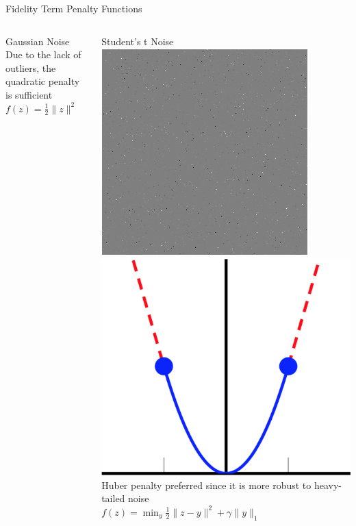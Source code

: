 \documentclass[12pt]{beamer}
\begin{document}
\begin{frame}{Fidelity Term Penalty Functions}
\begin{columns}[T]
\begin{column}{0.45\linewidth}
\begin{block}{Gaussian Noise}
		{\footnotesize Due to the lack of outliers, the quadratic penalty is sufficient} \\[1ex]
		\hspace{3em} $f(z) = \frac{1}{2} \| z \|^2$
		\end{block}
	\end{column}
	\begin{column}{0.45\linewidth}
		\begin{block}{Student's t Noise}
		\quad \includegraphics[scale=0.15]{../figures/student_t_noise.png} \hspace{1.5em}
		\includegraphics[scale=0.1]{../figures/huber} \\
		{\footnotesize Huber penalty preferred since it is more robust to heavy-tailed noise} \\[1ex]
		$f(z) = \min_y \frac{1}{2} \| z-y \|^2 + \gamma \| y \|_1$
		\end{block}
	\end{column}
\end{columns}

\end{frame}
\end{document}
